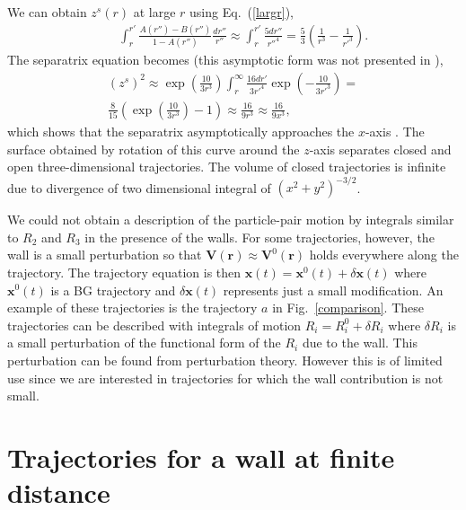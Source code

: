 We can obtain $z^s(r)$ at large $r$ using Eq.~(\ref{largr}),
\begin{eqnarray}&&\!\!\!\!\!\!\!\!\!\!\!\!\!\!\!\!
\int_r^{r'}\frac{A(r'')\!-\!B(r'')}{1\!-\!A(r'')}\frac{dr''}{r''}\approx \int_r^{r'}\frac{5dr''}{r''^4}=\frac{5}{3}\left(\frac{1}{r^3}-\frac{1}{r'^3}\right).\nonumber
\end{eqnarray}
The separatrix equation becomes (this asymptotic form was not presented in \cite{batchelor_green_1972}),
\begin{equation} \begin{aligned}   %
(z^s)^2\approx \exp\left(\frac{10}{3r^3}\right)\int_r^{\infty}\frac{16 dr'}{3r'^4}\exp\left(-\frac{10}{3r'^3}\right)
= \\ \frac{8}{15}\left(\exp\left(\frac{10}{3r^3}\right)-1\right)\approx \frac{16}{9r^3}\approx  \frac{16}{9x^3}, \label{bsgd}
\end{aligned} \end{equation} %
which shows that the separatrix asymptotically approaches the $x$-axis \citep{lin_lee_sather_1970}. The surface obtained by rotation of this curve around the $z$-axis separates closed and open three-dimensional trajectories. The volume of closed trajectories is infinite due to divergence of two dimensional integral of $(x^2+y^2)^{-3/2}$.

We could not obtain a description of the particle-pair motion by integrals similar to $R_2$ and $R_3$ in the presence of the walls. For some trajectories, however, the wall is a small perturbation so that $\bm V(\bm r)\approx \bm V^0(\bm r)$ holds everywhere along the trajectory. The trajectory equation is then $\bm x(t)=\bm x^0(t)+\delta \bm x(t)$ where $\bm x^0(t)$ is a BG trajectory and $\delta \bm x(t)$  represents just a small modification. An example of these trajectories is the trajectory $a$ in Fig.~\ref{comparison}. These trajectories can be described with integrals of motion $R_i=R_i^0+\delta R_i$ where $\delta R_i$ is a small perturbation of the functional form of the $R_i$ due to the wall. This perturbation can be found from perturbation theory.
However this is of limited use since we are interested in trajectories for which the wall contribution is not small.

\section{Trajectories for a wall at finite distance}\label{finitely}

